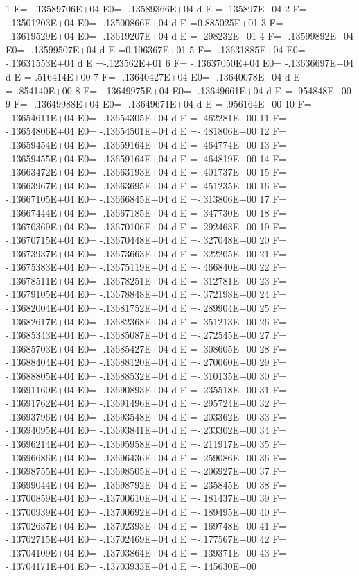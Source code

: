    1 F= -.13589706E+04 E0= -.13589366E+04  d E =-.135897E+04
   2 F= -.13501203E+04 E0= -.13500866E+04  d E =0.885025E+01
   3 F= -.13619529E+04 E0= -.13619207E+04  d E =-.298232E+01
   4 F= -.13599892E+04 E0= -.13599507E+04  d E =0.196367E+01
   5 F= -.13631885E+04 E0= -.13631553E+04  d E =-.123562E+01
   6 F= -.13637050E+04 E0= -.13636697E+04  d E =-.516414E+00
   7 F= -.13640427E+04 E0= -.13640078E+04  d E =-.854140E+00
   8 F= -.13649975E+04 E0= -.13649661E+04  d E =-.954848E+00
   9 F= -.13649988E+04 E0= -.13649671E+04  d E =-.956164E+00
  10 F= -.13654611E+04 E0= -.13654305E+04  d E =-.462281E+00
  11 F= -.13654806E+04 E0= -.13654501E+04  d E =-.481806E+00
  12 F= -.13659454E+04 E0= -.13659164E+04  d E =-.464774E+00
  13 F= -.13659455E+04 E0= -.13659164E+04  d E =-.464819E+00
  14 F= -.13663472E+04 E0= -.13663193E+04  d E =-.401737E+00
  15 F= -.13663967E+04 E0= -.13663695E+04  d E =-.451235E+00
  16 F= -.13667105E+04 E0= -.13666845E+04  d E =-.313806E+00
  17 F= -.13667444E+04 E0= -.13667185E+04  d E =-.347730E+00
  18 F= -.13670369E+04 E0= -.13670106E+04  d E =-.292463E+00
  19 F= -.13670715E+04 E0= -.13670448E+04  d E =-.327048E+00
  20 F= -.13673937E+04 E0= -.13673663E+04  d E =-.322205E+00
  21 F= -.13675383E+04 E0= -.13675119E+04  d E =-.466840E+00
  22 F= -.13678511E+04 E0= -.13678251E+04  d E =-.312781E+00
  23 F= -.13679105E+04 E0= -.13678848E+04  d E =-.372198E+00
  24 F= -.13682004E+04 E0= -.13681752E+04  d E =-.289904E+00
  25 F= -.13682617E+04 E0= -.13682368E+04  d E =-.351213E+00
  26 F= -.13685343E+04 E0= -.13685087E+04  d E =-.272545E+00
  27 F= -.13685703E+04 E0= -.13685427E+04  d E =-.308605E+00
  28 F= -.13688404E+04 E0= -.13688120E+04  d E =-.270060E+00
  29 F= -.13688805E+04 E0= -.13688532E+04  d E =-.310135E+00
  30 F= -.13691160E+04 E0= -.13690893E+04  d E =-.235518E+00
  31 F= -.13691762E+04 E0= -.13691496E+04  d E =-.295724E+00
  32 F= -.13693796E+04 E0= -.13693548E+04  d E =-.203362E+00
  33 F= -.13694095E+04 E0= -.13693841E+04  d E =-.233302E+00
  34 F= -.13696214E+04 E0= -.13695958E+04  d E =-.211917E+00
  35 F= -.13696686E+04 E0= -.13696436E+04  d E =-.259086E+00
  36 F= -.13698755E+04 E0= -.13698505E+04  d E =-.206927E+00
  37 F= -.13699044E+04 E0= -.13698792E+04  d E =-.235845E+00
  38 F= -.13700859E+04 E0= -.13700610E+04  d E =-.181437E+00
  39 F= -.13700939E+04 E0= -.13700692E+04  d E =-.189495E+00
  40 F= -.13702637E+04 E0= -.13702393E+04  d E =-.169748E+00
  41 F= -.13702715E+04 E0= -.13702469E+04  d E =-.177567E+00
  42 F= -.13704109E+04 E0= -.13703864E+04  d E =-.139371E+00
  43 F= -.13704171E+04 E0= -.13703933E+04  d E =-.145630E+00
